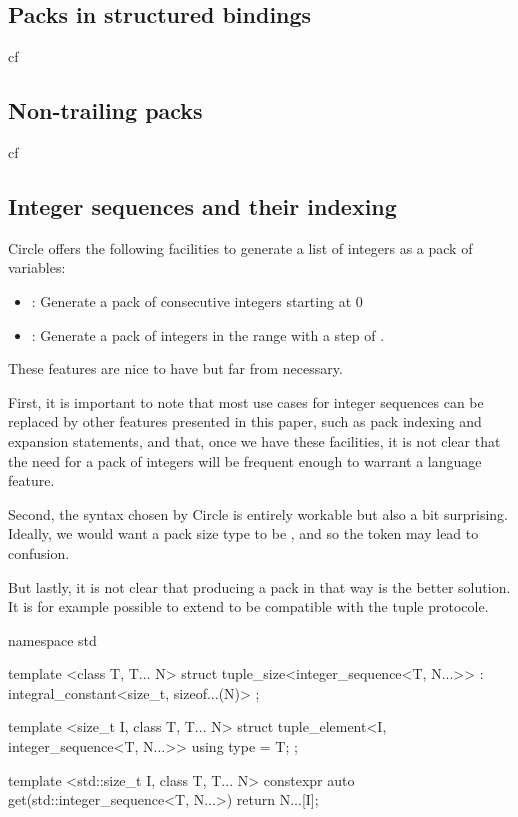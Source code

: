 \documentclass{wg21}
\begin{document}

\subsection{Packs in structured bindings}

cf 


\subsection{Non-trailing packs}

cf 


\subsection{Integer sequences and their indexing}

Circle offers the following facilities to generate a list of integers as a pack of variables:

\begin{itemize}
\item {} : Generate a pack of  consecutive integers starting at 0
\item {} : Generate a pack of integers in the range  with a step of .
\end{itemize}

These features are nice to have but far from necessary.

First, it is important to note that most use cases for integer sequences can be replaced by other features presented in this paper,
such as pack indexing and expansion statements, and that, once we have these facilities, it is not clear that the need for a
pack of integers will be frequent enough to warrant a language feature.

Second, the syntax chosen by Circle is entirely workable but also a bit surprising.
Ideally, we would want a pack size type to be , and so the token  may lead to confusion.

But lastly, it is not clear that producing a pack in that way is the better solution.
It is for example possible to extend  to be compatible with the tuple protocole.

\begin{colorblock}
namespace std {
    template <class T, T... N>
    struct tuple_size<integer_sequence<T, N...>>
    : integral_constant<size_t, sizeof...(N)>
    { };

    template <size_t I,  class T, T... N>
    struct tuple_element<I, integer_sequence<T, N...>> {
        using type = T;
    };

    template <std::size_t I,  class T, T... N>
    constexpr auto get(std::integer_sequence<T, N...>) {
        return N...[I];
    }
}
\end{colorblock}
\end{document}
